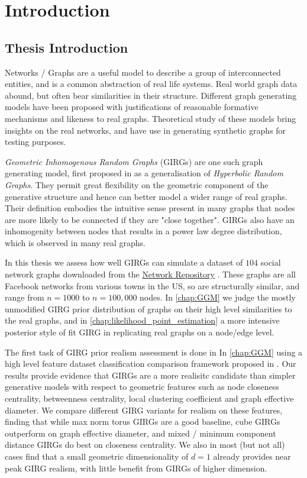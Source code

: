\chapter{Introduction}
\label{chap:introduction}
\section{Thesis Introduction}
Networks / Graphs are a useful model to describe a group of interconnected entities, and is a common abstraction of real life systems. Real world graph data abound, but often bear similarities in their structure. Different graph generating models have been proposed with justifications of reasonable formative mechanisms and likeness to real graphs. Theoretical study of these models bring insights on the real networks, and have use in generating synthetic graphs for testing purposes. 

\textit{Geometric Inhomogenous Random Graphs} (GIRGs) are one such graph generating model, first proposed in \cite{bringmann2016average} as a generalisation of  \textit{Hyperbolic Random Graphs}. They permit great flexibility on the geometric component of the generative structure and hence can better model a wider range of real graphs. Their definition embodies the intuitive sense present in many graphs that nodes are more likely to be connected if they are "close together". GIRGs also have an inhomogenity between nodes that results in a power law degree distribution, which is observed in many real graphs.

In this thesis we assess how well GIRGs can simulate a dataset of $104$ social network graphs downloaded from the \href{https://networkrepository.com/}{Network Repository} \cite{rossi2015network}. These graphs are all Facebook networks from various towns in the US, so are structurally similar, and range from $n=1000$ to $n=100,000$ nodes. In \cref{chap:GGM} we judge the mostly unmodified GIRG prior distribution of graphs on their high level similarities to the real graphs, and in \cref{chap:likelihood_point_estimation} a more intensive posterior style of fit GIRG in replicating real graphs on a node/edge level. 

The first task of GIRG prior realism assessment is done in In \cref{chap:GGM} using a high level feature dataset classification comparison framework proposed in \cite{blasius2018towards}. Our results provide evidence that GIRGs are a more realisitc candidate than simpler generative models with respect to geometric features such as node closeness centrality, betweenness centrality, local clustering coefficient and graph effective diameter.
We compare different GIRG variants for realism on these features, finding that while max norm torus GIRGs are a good baseline, cube GIRGs outperform on graph effective diameter, and mixed / minimum component distance GIRGs do best on closeness centrality.
We also in most (but not all) cases find that a small geometric dimensionality of $d=1$ already provides near peak GIRG realism, with little benefit from GIRGs of higher dimension. 

